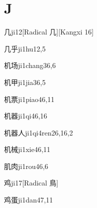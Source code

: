 
\section*{J}

\begin{entry}{几}{ji1}{2}[Radical 几][Kangxi 16]
\end{entry}

\begin{entry}{几乎}{ji1hu1}{2,5}
\end{entry}

\begin{entry}{机场}{ji1chang3}{6,6}
\end{entry}

\begin{entry}{机甲}{ji1jia3}{6,5}
\end{entry}

\begin{entry}{机票}{ji1piao4}{6,11}
\end{entry}

\begin{entry}{机器}{ji1qi4}{6,16}
\end{entry}

\begin{entry}{机器人}{ji1qi4ren2}{6,16,2}
\end{entry}

\begin{entry}{机械}{ji1xie4}{6,11}
\end{entry}

\begin{entry}{肌肉}{ji1rou4}{6,6}
\end{entry}

\begin{entry}{鸡}{ji1}{7}[Radical 鳥]
\end{entry}

\begin{entry}{鸡蛋}{ji1dan4}{7,11}
\end{entry}

